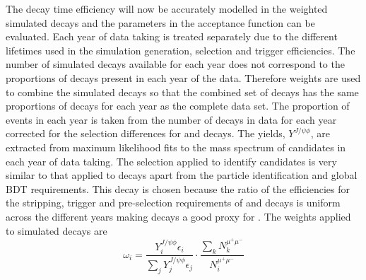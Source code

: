The decay time efficiency will now be accurately modelled in the weighted simulated \bsmumu decays and the parameters in the acceptance function can be evaluated. Each year of data taking is treated separately due to the different \bs lifetimes used in the simulation generation, selection and trigger efficiencies. The number of simulated decays available for each year does not correspond to the proportions of decays present in each year of the data. Therefore weights are used to combine the simulated decays so that the combined set of decays has the same proportions of decays for each year as the complete data set. 
The proportion of events in each year is taken from the number of \bsjpsiphi decays in data for each year corrected for the selection differences for \bsmumu and \bsjpsiphi decays. The \bsjpsiphi yields, $Y^{J/\psi \phi}$, are extracted from maximum likelihood fits to the mass spectrum of candidates in each year of data taking. The selection applied to identify \bsjpisphi candidates is very similar to that applied to \bsmumu decays apart from the particle identification and global BDT requirements. This decay is chosen because the ratio of the efficiencies for the stripping, trigger and pre-selection requirements of \bsmumu and \bsjpsiphi decays is uniform across the different years making \bsjpsiphi decays a good proxy for \bsmumu. 
The weights applied to simulated \bsmumu decays are
\begin{equation}
\omega_{i}  = \frac{Y_{i}^{J/\psi \phi} \epsilon_{i}}{\displaystyle\sum_{j} Y_{j}^{J/\psi \phi} \epsilon_{j}} \cdot \frac{\displaystyle\sum_{k} N_{k}^{\mu^{+}\mu^{-}}}{N_{i}^{\mu^{+}\mu^{-}}}
\end{equation}
